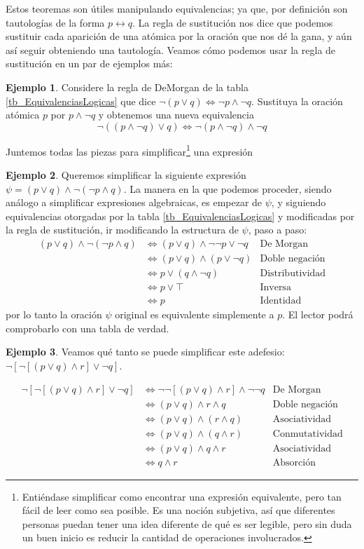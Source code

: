 \documentclass{book}
\theoremstyle{definition}
\newtheorem*{ejm}{Ejemplo}
\begin{document}
Estos teoremas son útiles manipulando equivalencias; ya que, por definición son tautologías de la forma $p\leftrightarrow q$.
La regla de sustitución nos dice que podemos sustituir cada aparición de una atómica por la oración que nos dé la gana, y aún así seguir obteniendo una tautología.
Veamos cómo podemos usar la regla de sustitución en un par de ejemplos más:
\begin{ejm}
	Considere la regla de DeMorgan de la tabla \ref{tb_EquivalenciasLogicas} que dice $\neg(p \vee q) \iff \neg p \wedge \neg q$. Sustituya la oración atómica $p$ por $p\wedge \neg q$ y obtenemos una nueva equivalencia \[\neg ((p \wedge \neg q) \vee q) \iff \neg (p \wedge \neg q) \wedge \neg q\]
\end{ejm}
Juntemos todas las piezas para simplificar\footnote{Entiéndase simplificar como encontrar una expresión equivalente, pero tan fácil de leer como sea posible. Es una noción subjetiva, así que diferentes personas puedan tener una idea diferente de qué es ser legible, pero sin duda un buen inicio es reducir la cantidad de operaciones involucrados.} una expresión
\begin{ejm}
	Queremos simplificar la siguiente expresión $\psi = (p\vee q)\wedge \neg(\neg p \wedge q)$. La manera en la que podemos proceder, siendo análogo a simplificar expresiones algebraicas, es empezar de $\psi$, y siguiendo equivalencias otorgadas por la tabla \ref{tb_EquivalenciasLogicas} y modificadas por la regla de sustitución, ir modificando la estructura de $\psi$, paso a paso:
	\begin{align*}
		(p\vee q)\wedge \neg(\neg p \wedge q) & \iff (p \vee q)\wedge \neg \neg p \vee \neg q & \text{De Morgan}
		\\ & \iff (p \vee q)\wedge (p\vee \neg q) & \text{Doble negación}
		\\ & \iff p \vee (q \wedge \neg q) & \text{Distributividad}
		\\ & \iff p \vee \top & \text{Inversa}
		\\ & \iff p & \text{Identidad}
	\end{align*}
	por lo tanto la oración $\psi$ original es equivalente simplemente a $p$. El lector podrá comprobarlo con una tabla de verdad.
\end{ejm}
\begin{ejm}
	Veamos qué tanto se puede simplificar este adefesio: $\neg \left[\neg \left[ (p\vee q)\wedge r\right]\vee \neg q \right]$.
	
	\begin{align*}
		\neg \left[\neg \left[ (p\vee q)\wedge r\right]\vee \neg q \right] & \iff \neg \neg \left[ (p\vee q)\wedge r\right] \wedge \neg \neg q & \text{De Morgan} \\
		& \iff  (p\vee q)\wedge r \wedge q & \text{Doble negación}\\
		& \iff (p \vee q)\wedge (r \wedge q) & \text{Asociatividad}\\
		& \iff (p\vee q)\wedge (q \wedge r) & \text{Conmutatividad}\\
		& \iff (p\vee q)\wedge q \wedge r & \text{Asociatividad}\\
		& \iff q \wedge r & \text{Absorción}
	\end{align*}
\end{ejm}
\end{document}
